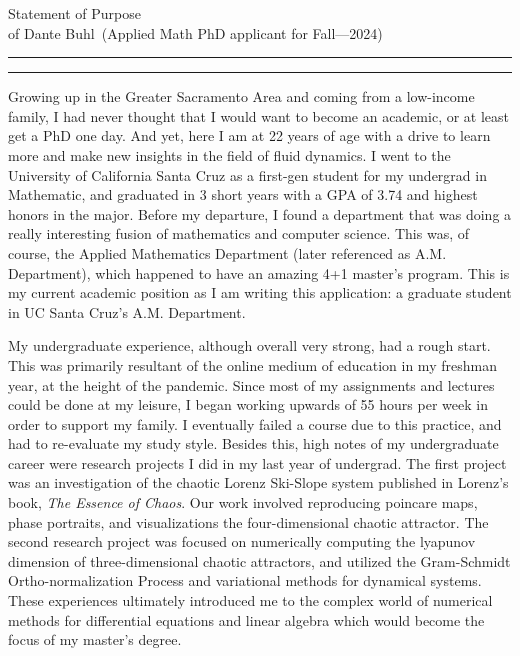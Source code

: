 \documentclass{article}
\newcommand{\soptitle}{Statement of Purpose}
\newcommand{\yourname}{Dante Buhl}
\begin{document}
\begin{center}\LARGE\soptitle\\
\large of \yourname\ (Applied Math PhD applicant for Fall---2024)
\end{center}

\hrule
\vspace{1pt}
\hrule height 1pt

\bigskip

\large
Growing up in the Greater Sacramento Area and coming from a low-income family, I had never thought that I would want to become an academic, or at least get a PhD one day. And yet, here I am at 22 years of age with a drive to learn more and make new insights in the field of fluid dynamics. I went to the University of California Santa Cruz as a first-gen student for my undergrad in Mathematic, and graduated in 3 short years with a GPA of 3.74 and highest honors in the major. Before my departure, I found a department that was doing a really interesting fusion of mathematics and computer science. This was, of course, the Applied Mathematics Department (later referenced as A.M. Department), which happened to have an amazing 4+1 master's program. This is my current academic position as I am writing this application: a graduate student in UC Santa Cruz's A.M. Department. 

My undergraduate experience, although overall very strong, had a rough start. This was primarily resultant of the online medium of education in my freshman year, at the height of the pandemic. Since most of my assignments and lectures could be done at my leisure, I began working upwards of 55 hours per week in order to support my family. I eventually failed a course due to this practice, and had to re-evaluate my study style. Besides this, high notes of my undergraduate career were research projects I did in my last year of undergrad. The first project was an investigation of the chaotic Lorenz Ski-Slope system published in Lorenz's book, \textit{The Essence of Chaos}. Our work involved reproducing poincare maps, phase portraits, and visualizations the four-dimensional chaotic attractor. The second research project was focused on numerically computing the lyapunov dimension of three-dimensional chaotic attractors, and utilized the Gram-Schmidt Ortho-normalization Process and variational methods for dynamical systems. These experiences ultimately introduced me to the complex world of numerical methods for differential equations and linear algebra which would become the focus of my master's degree. 
\end{document}

